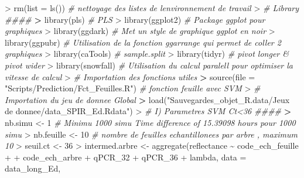 \documentclass[
  11pt,
  french,
  a4paper,
  extrafontsizes,onecolumn,openright
  ]{memoir}
\newenvironment{Shaded}{\begin{snugshade}}{\end{snugshade}}
\newcommand{\AttributeTok}[1]{\textcolor[rgb]{0.77,0.63,0.00}{#1}}
\newcommand{\CommentTok}[1]{\textcolor[rgb]{0.56,0.35,0.01}{\textit{#1}}}
\newcommand{\DecValTok}[1]{\textcolor[rgb]{0.00,0.00,0.81}{#1}}
\newcommand{\ErrorTok}[1]{\textcolor[rgb]{0.64,0.00,0.00}{\textbf{#1}}}
\newcommand{\FunctionTok}[1]{\textcolor[rgb]{0.00,0.00,0.00}{#1}}
\newcommand{\NormalTok}[1]{#1}
\newcommand{\OtherTok}[1]{\textcolor[rgb]{0.56,0.35,0.01}{#1}}
\newcommand{\SpecialCharTok}[1]{\textcolor[rgb]{0.00,0.00,0.00}{#1}}
\newcommand{\StringTok}[1]{\textcolor[rgb]{0.31,0.60,0.02}{#1}}
\begin{document}
\begin{Shaded}
\begin{Highlighting}[]
\SpecialCharTok{\textgreater{}} \FunctionTok{rm}\NormalTok{(}\AttributeTok{list =} \FunctionTok{ls}\NormalTok{())  }\CommentTok{\# nettoyage des listes de l\textquotesingle{}environnement de travail}
\SpecialCharTok{\textgreater{}} \CommentTok{\# Library \#\#\#\#}
\ErrorTok{\textgreater{}} \FunctionTok{library}\NormalTok{(pls)  }\CommentTok{\# PLS}
\SpecialCharTok{\textgreater{}} \FunctionTok{library}\NormalTok{(ggplot2)  }\CommentTok{\# Package ggplot pour graphiques}
\SpecialCharTok{\textgreater{}} \FunctionTok{library}\NormalTok{(ggdark)  }\CommentTok{\# Met un style de graphique ggplot en noir}
\SpecialCharTok{\textgreater{}} \FunctionTok{library}\NormalTok{(ggpubr)  }\CommentTok{\# Utilisation de la fonction ggarrange qui permet de coller 2 graphiques}
\SpecialCharTok{\textgreater{}} \FunctionTok{library}\NormalTok{(caTools)  }\CommentTok{\# sample.split}
\SpecialCharTok{\textgreater{}} \FunctionTok{library}\NormalTok{(tidyr)  }\CommentTok{\# pivot longer \& pivot wider}
\SpecialCharTok{\textgreater{}} \FunctionTok{library}\NormalTok{(snowfall)  }\CommentTok{\# Utilisation du calcul paralell pour optimiser la vitesse de calcul}
\SpecialCharTok{\textgreater{}} \CommentTok{\# Importation des fonctions utiles}
\ErrorTok{\textgreater{}} \FunctionTok{source}\NormalTok{(}\AttributeTok{file =} \StringTok{"Scripts/Prediction/Fct\_Feuilles.R"}\NormalTok{)  }\CommentTok{\# fonction feuille avec SVM}
\SpecialCharTok{\textgreater{}} \CommentTok{\# Importation du jeu de donnee Global}
\ErrorTok{\textgreater{}} \FunctionTok{load}\NormalTok{(}\StringTok{"Sauvegardes\_objet\_R.data/Jeux de donnee/data\_SPIR\_Ed.Rdata"}\NormalTok{)}
\SpecialCharTok{\textgreater{}} \CommentTok{\# I) Parametres SVM Ct\textless{}36 \#\#\#\#}
\ErrorTok{\textgreater{}}\NormalTok{ nb.simu }\OtherTok{\textless{}{-}} \DecValTok{1}  \CommentTok{\# Minimu 1000 simu  Time difference of 15.39098 hours pour 1000 simu}
\SpecialCharTok{\textgreater{}}\NormalTok{ nb.feuille }\OtherTok{\textless{}{-}} \DecValTok{10}  \CommentTok{\# nombre de feuilles echantillonees par arbre , maximum 10}
\SpecialCharTok{\textgreater{}}\NormalTok{ seuil.ct }\OtherTok{\textless{}{-}} \DecValTok{36}
\SpecialCharTok{\textgreater{}}\NormalTok{ intermed.arbre }\OtherTok{\textless{}{-}} \FunctionTok{aggregate}\NormalTok{(reflectance }\SpecialCharTok{\textasciitilde{}}\NormalTok{ code\_ech\_feuille }\SpecialCharTok{+} 
\SpecialCharTok{+}\NormalTok{     code\_ech\_arbre }\SpecialCharTok{+}\NormalTok{ qPCR\_32 }\SpecialCharTok{+}\NormalTok{ qPCR\_36 }\SpecialCharTok{+}\NormalTok{ lambda, }\AttributeTok{data =}\NormalTok{ data\_long\_Ed, }

\end{Highlighting}
\end{Shaded}
\end{document}
